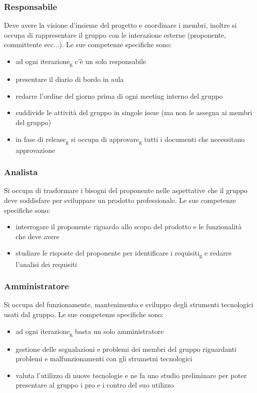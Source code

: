 \subsubsection{Responsabile}
Deve avere la visione d'insieme del progetto e coordinare i membri, inoltre si occupa di rappresentare il gruppo con le interazione esterne (proponente, committente ecc...). Le sue competenze specifiche sono:
\begin{itemize}
	\item ad ogni iterazione\textsubscript{g} c'è un solo responsabile
	\item presentare il diario di bordo in aula
	\item redarre l'ordine del giorno prima di ogni meeting interno del gruppo
	\item suddivide le attività del gruppo in singole issue (ma non le assegna ai membri del gruppo)
	\item in fase di release\textsubscript{g} si occupa di approvare\textsubscript{g} tutti i documenti che necessitano approvazione
\end{itemize}

\subsubsection{Analista}
Si occupa di trasformare i bisogni del proponente nelle aspettative che il gruppo deve soddisfare per sviluppare un prodotto professionale. Le sue competenze specifiche sono:
\begin{itemize}
	\item interrogare il proponente riguardo allo scopo del prodotto e le funzionalità che deve avere
	\item studiare le risposte del proponente per identificare i requisiti\textsubscript{g} e redarre l'analisi dei requisiti
\end{itemize}

\subsubsection{Amministratore}
Si occupa del funzionamente, mantenimento e sviluppo degli strumenti tecnologici usati dal gruppo. Le sue competenze specifiche sono:
\begin{itemize}
	\item ad ogni iterazione\textsubscript{g} basta un solo amministratore
	\item gestione delle segnalazioni e problemi dei membri del gruppo riguardanti problemi e malfunzionamenti con gli strumetni tecnologici
	\item valuta l'utilizzo di nuove tecnologie e ne fa uno studio preliminare per poter presentare al gruppo i pro e i contro del suo utilizzo
\end{itemize}


